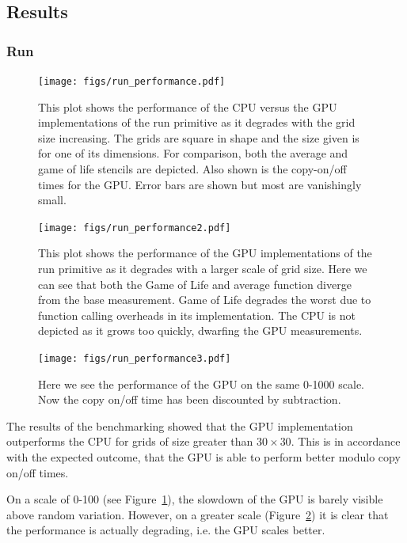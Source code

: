 \documentclass[12pt,a4paper,twoside]{scrbook}
\begin{document}
\subsection{Results}

\subsubsection{Run}

\begin{figure}[h]
  \texttt{[image: figs/run\_performance.pdf]}
  \caption{This plot shows the performance of the CPU versus the GPU
    implementations of the run primitive as it degrades with the grid size
    increasing. The grids are square in shape and the size given is for one of
    its dimensions. For comparison, both the average and game of life stencils
    are depicted. Also shown is the copy-on/off times for the GPU. Error bars
    are shown but most are vanishingly small.}
  \label{fig:runperf100}
\end{figure}

\begin{figure}[h]
  \texttt{[image: figs/run\_performance2.pdf]}
  \caption{This plot shows the performance of the GPU implementations of the run
    primitive as it degrades with a larger scale of grid size. Here we can see
    that both the Game of Life and average function diverge from the base
    measurement. Game of Life degrades the worst due to function calling
    overheads in its implementation. The CPU is not depicted as it grows too
    quickly, dwarfing the GPU measurements. }
  \label{fig:runperf1000}
\end{figure}

\begin{figure}[h]
  \texttt{[image: figs/run\_performance3.pdf]}
  \caption{Here we see the performance of the GPU on the same 0-1000 scale. Now
    the copy on/off time has been discounted by subtraction.}
  \label{fig:runperf1000dis}
\end{figure}

The results of the benchmarking showed that the GPU implementation outperforms
the CPU for grids of size greater than $30 \times 30$. This is in accordance
with the expected outcome, that the GPU is able to perform better modulo copy
on/off times.

On a scale of 0-100 (see Figure~\ref{fig:runperf100}), the slowdown of the GPU
is barely visible above random variation. However, on a greater scale
(Figure~\ref{fig:runperf1000}) it is clear that the performance is actually
degrading, i.e. the GPU scales better.
\end{document}
